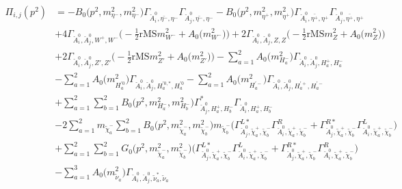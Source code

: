 \begin{itemize}
\begin{align} 
\Pi_{i,j}(p^2) &= - {B_0\Big(p^{2},m^2_{\eta^-},m^2_{\eta^-}\Big)} {\Gamma_{\check{A}^0_{{i}},\bar{\eta^-},\eta^-}} {\Gamma_{\check{A}^0_{{j}},\bar{\eta^-},\eta^-}} - {B_0\Big(p^{2},m^2_{\eta^+},m^2_{\eta^+}\Big)} {\Gamma_{\check{A}^0_{{i}},\bar{\eta^+},\eta^+}} {\Gamma_{\check{A}^0_{{j}},\bar{\eta^+},\eta^+}} \nonumber \\ 
 &+4 {\Gamma_{\check{A}^0_{{i}},\check{A}^0_{{j}},W^+,W^-}} \Big(-\frac{1}{2} \text{rMS} m^2_{W^-}  + {A_0\Big(m^2_{W^-}\Big)}\Big)+2 {\Gamma_{\check{A}^0_{{i}},\check{A}^0_{{j}},Z,Z}} \Big(-\frac{1}{2} \text{rMS} m^2_{Z}  + {A_0\Big(m^2_{Z}\Big)}\Big)\nonumber \\ 
 &+2 {\Gamma_{\check{A}^0_{{i}},\check{A}^0_{{j}},{Z'},{Z'}}} \Big(-\frac{1}{2} \text{rMS} m^2_{{Z'}}  + {A_0\Big(m^2_{{Z'}}\Big)}\Big)- \sum_{a=1}^{2}{A_0\Big(m^2_{H^-_{{a}}}\Big)} {\Gamma_{\check{A}^0_{{i}},\check{A}^0_{{j}},H^+_{{a}},H^-_{{a}}}}  \nonumber \\ 
 &- \sum_{a=1}^{2}{A_0\Big(m^2_{H^{'0}_{{a}}}\Big)} {\Gamma_{\check{A}^0_{{i}},\check{A}^0_{{j}},H^{{'0},*}_{{a}},H^{'0}_{{a}}}}  - \sum_{a=1}^{2}{A_0\Big(m^2_{H^{'-}_{{a}}}\Big)} {\Gamma_{\check{A}^0_{{i}},\check{A}^0_{{j}},H^{'+}_{{a}},H^{'-}_{{a}}}}  \nonumber \\ 
 &+\sum_{a=1}^{2}\sum_{b=1}^{2}{B_0\Big(p^{2},m^2_{H^-_{{a}}},m^2_{H^-_{{b}}}\Big)} {\Gamma^*_{\check{A}^0_{{j}},H^+_{{a}},H^-_{{b}}}} {\Gamma_{\check{A}^0_{{i}},H^+_{{a}},H^-_{{b}}}} \nonumber \\ 
 &-2 \sum_{a=1}^{2}m_{\tilde{\chi}^-_{{a}}} \sum_{b=1}^{2}{B_0\Big(p^{2},m^2_{\tilde{\chi}^-_{{a}}},m^2_{\tilde{\chi}^-_{{b}}}\Big)} m_{\tilde{\chi}^-_{{b}}} \Big({\Gamma^{L*}_{\check{A}^0_{{j}},\tilde{\chi}^+_{{a}},\tilde{\chi}^-_{{b}}}} {\Gamma^R_{\check{A}^0_{{i}},\tilde{\chi}^+_{{a}},\tilde{\chi}^-_{{b}}}}  + {\Gamma^{R*}_{\check{A}^0_{{j}},\tilde{\chi}^+_{{a}},\tilde{\chi}^-_{{b}}}} {\Gamma^L_{\check{A}^0_{{i}},\tilde{\chi}^+_{{a}},\tilde{\chi}^-_{{b}}}} \Big)  \nonumber \\ 
 &+\sum_{a=1}^{2}\sum_{b=1}^{2}{G_0\Big(p^{2},m^2_{\tilde{\chi}^-_{{a}}},m^2_{\tilde{\chi}^-_{{b}}}\Big)} \Big({\Gamma^{L*}_{\check{A}^0_{{j}},\tilde{\chi}^+_{{a}},\tilde{\chi}^-_{{b}}}} {\Gamma^L_{\check{A}^0_{{i}},\tilde{\chi}^+_{{a}},\tilde{\chi}^-_{{b}}}}  + {\Gamma^{R*}_{\check{A}^0_{{j}},\tilde{\chi}^+_{{a}},\tilde{\chi}^-_{{b}}}} {\Gamma^R_{\check{A}^0_{{i}},\tilde{\chi}^+_{{a}},\tilde{\chi}^-_{{b}}}} \Big)\nonumber \\ 
 &- \sum_{a=1}^{3}{A_0\Big(m^2_{\tilde{\nu}_{{a}}}\Big)} {\Gamma_{\check{A}^0_{{i}},\check{A}^0_{{j}},\tilde{\nu}^*_{{a}},\tilde{\nu}_{{a}}}}  \nonumber \\ 

\end{align}
\end{itemize}
